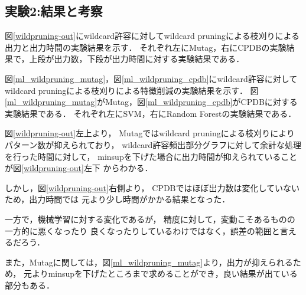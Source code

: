 \fi

\subsection{実験2:結果と考察}
\label{subsec:exp3}%

図\ref{wildpruning-out}にwildcard許容に対してwildcard pruningによる枝刈りによる出力と出力時間の実験結果を示す．
それぞれ左にMutag，右にCPDBの実験結果で，上段が出力数，下段が出力時間に対する実験結果である．

図\ref{ml_wildpruning_mutag}，図\ref{ml_wildpruning_cpdb}にwildcard許容に対して
wildcard pruningによる枝刈りによる特徴削減の実験結果を示す．
図\ref{ml_wildpruning_mutag}がMutag，図\ref{ml_wildpruning_cpdb}がCPDBに対する実験結果である．
それぞれ左にSVM，右にRandom Forestの実験結果である．

図\ref{wildpruning-out}左上より，
Mutagではwildcard pruningによる枝刈りによりパターン数が抑えられており，
wildcard許容頻出部分グラフに対して余計な処理を行った時間に対して，
minsupを下げた場合に出力時間が抑えられていることが図\ref{wildpruning-out}左下
からわかる．

しかし，図\ref{wildpruning-out}右側より，
CPDBではほぼ出力数は変化していないため，出力時間では
元より少し時間がかかる結果となった．

一方で，機械学習に対する変化であるが，
精度に対して，変動こそあるものの一方的に悪くなったり
良くなったりしているわけではなく，誤差の範囲と言えるだろう．

また，Mutagに関しては，図\ref{ml_wildpruning_mutag}より，出力が抑えられるため，
元よりminsupを下げたところまで求めることができ，良い結果が出ている部分もある．


